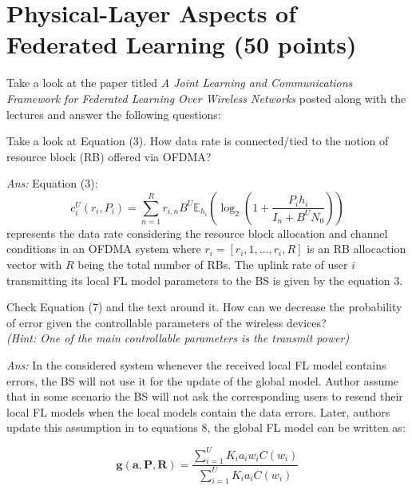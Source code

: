 \documentclass{article} %
\begin{document}
\newpage 
\section{Physical-Layer Aspects of Federated Learning (50 points)}
Take a look at the paper titled \textit{A Joint Learning and Communications Framework for Federated
Learning Over Wireless Networks} posted along with the lectures and answer the following questions:

\begin{question}
Take a look at Equation (3). How data rate is connected/tied to the notion of resource block (RB) offered via OFDMA?
\end{question}
\textit{Ans: }Equation (3): 
\[ c_i^U \left( r_i, P_i \right) = \sum_{n=1}^{R} r_{i,n} B^U \mathbb{E}_{h_i} \left( \log_2 \left( 1 + \frac{P_i h_i}{I_n + B^U N_0} \right) \right) \]
represents the data rate considering the resource block allocation and channel conditions in an OFDMA system where $r_i = [r_i, 1, ..., r_i, R]$ is an RB allocaction vector with $R$ being the total number of RBs. The uplink rate of user $i$ transmitting its local FL model parameters to the BS is given by the equation 3.



\begin{question}
Check Equation (7) and the text around it. How can we decrease the probability of
error given the controllable parameters of the wireless devices?\\ \textit{(Hint: One of the main controllable parameters is the transmit power)}
\end{question}

\textit{Ans: }In the considered system whenever the received local FL model contains errors, the BS will not use it for the update of the global model. Author assume that in some scenario the BS will not ask the corresponding users to resend their local FL models when the local models contain the data errors. Later, authors update this assumption in to equations 8, the global FL model can be written as:

$$
\mathbf{g}(\mathbf{a}, \mathbf{P}, \mathbf{R}) = \frac{\sum_{i=1}^{U} K_i a_i w_i C(w_i)}{\sum_{i=1}^{U} K_i a_i C(w_i)}
$$
\end{document}
